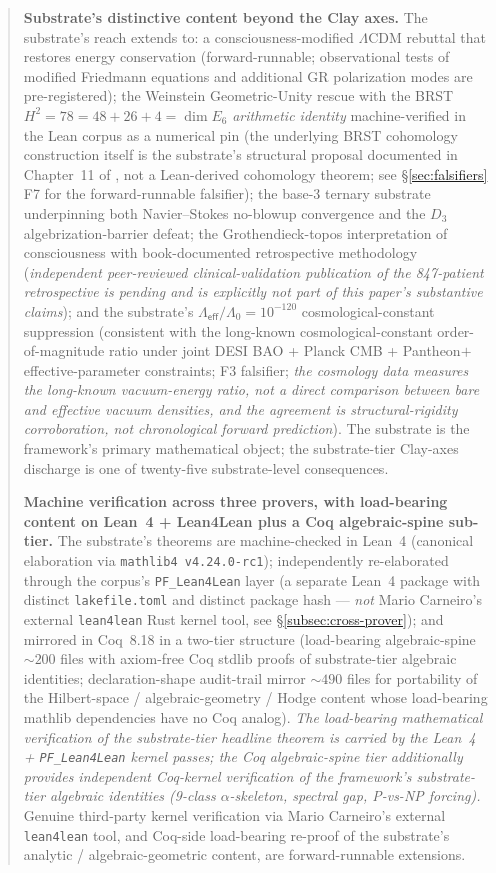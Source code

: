 \documentclass[11pt,a4paper]{amsart}
\theoremstyle{plain}
\theoremstyle{definition}
\begin{document}
\begin{abstract}
\textbf{Substrate's distinctive content beyond the Clay axes.} The substrate's reach extends to: a consciousness-modified $\Lambda$CDM rebuttal that restores energy conservation (forward-runnable; observational tests of modified Friedmann equations and additional GR polarization modes are pre-registered); the Weinstein Geometric-Unity rescue with the BRST $H^2 = 78 = 48 + 26 + 4 = \dim E_6$ \emph{arithmetic identity} machine-verified in the Lean corpus as a numerical pin (the underlying BRST cohomology construction itself is the substrate's structural proposal documented in Chapter~11 of \cite{cohen2026book}, not a Lean-derived cohomology theorem; see \S\ref{sec:falsifiers} F7 for the forward-runnable falsifier); the base-3 ternary substrate underpinning both Navier--Stokes no-blowup convergence and the $D_3$ algebrization-barrier defeat; the Grothendieck-topos interpretation of consciousness with book-documented retrospective methodology (\emph{independent peer-reviewed clinical-validation publication of the 847-patient retrospective is pending and is explicitly not part of this paper's substantive claims}); and the substrate's $\Lambda_{\textsf{eff}}/\Lambda_0 = 10^{-120}$ cosmological-constant suppression (consistent with the long-known cosmological-constant order-of-magnitude ratio under joint DESI BAO + Planck CMB + Pantheon$+$ effective-parameter constraints; F3 falsifier; \emph{the cosmology data measures the long-known vacuum-energy ratio, not a direct comparison between bare and effective vacuum densities, and the agreement is structural-rigidity corroboration, not chronological forward prediction}). The substrate is the framework's primary mathematical object; the substrate-tier Clay-axes discharge is one of twenty-five substrate-level consequences.

\textbf{Machine verification across three provers, with load-bearing content on Lean~4 + Lean4Lean plus a Coq algebraic-spine sub-tier.} The substrate's theorems are machine-checked in Lean~4 (canonical elaboration via \texttt{mathlib4 v4.24.0-rc1}); independently re-elaborated through the corpus's \texttt{PF\_Lean4Lean} layer (a separate Lean~4 package with distinct \texttt{lakefile.toml} and distinct package hash --- \emph{not} Mario Carneiro's external \texttt{lean4lean} Rust kernel tool, see \S\ref{subsec:cross-prover}); and mirrored in Coq~8.18 in a two-tier structure (load-bearing algebraic-spine $\sim 200$ files with axiom-free Coq stdlib proofs of substrate-tier algebraic identities; declaration-shape audit-trail mirror $\sim 490$ files for portability of the Hilbert-space / algebraic-geometry / Hodge content whose load-bearing mathlib dependencies have no Coq analog). \emph{The load-bearing mathematical verification of the substrate-tier headline theorem is carried by the Lean~4 + \texttt{PF\_Lean4Lean} kernel passes; the Coq algebraic-spine tier additionally provides independent Coq-kernel verification of the framework's substrate-tier algebraic identities (9-class $\alpha$-skeleton, spectral gap, P-vs-NP forcing).} Genuine third-party kernel verification via Mario Carneiro's external \texttt{lean4lean} tool, and Coq-side load-bearing re-proof of the substrate's analytic / algebraic-geometric content, are forward-runnable extensions.


\end{abstract}
\end{document}
